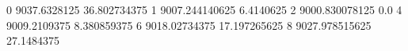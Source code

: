 0 9037.6328125 36.802734375
1 9007.244140625 6.4140625
2 9000.830078125 0.0
4 9009.2109375 8.380859375
6 9018.02734375 17.197265625
8 9027.978515625 27.1484375
